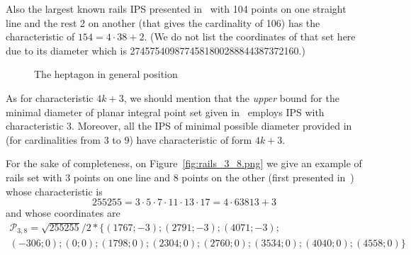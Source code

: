 \documentclass[a4paper,14pt]{article} %
\theoremstyle{plain}
\theoremstyle{definition}
\begin{document}
Also the largest known rails IPS presented in~\cite{momot2022example}
with 104 points on one straight line and the rest 2 on another
(that gives the cardinality of 106) has the characteristic of $154 = 4 \cdot 38 + 2$.
(We do not list the coordinates of that set here due to its diameter which is 2745754098774581800288844387372160.)

\begin{figure}
\caption{The heptagon in general position}
\label{fig:heptagon2}
\end{figure}

As for characteristic $4k+3$, we should mention that the \emph{upper} bound for the minimal diameter
of planar integral point set given in~\cite{harborth1993upper} employs IPS with characteristic $3$.
Moreover, all the IPS of minimal possible diameter provided in~\cite[\S 5, Figure 1]{harborth1993upper}
(for cardinalities from 3 to 9) have characteristic of form $4k+3$.

For the sake of completeness, on Figure~\ref{fig:rails_3_8.png}
we give an example of rails set
with 3 points on one line and 8 points on the other (first presented in~\cite[Figure 1]{avdeev2019particular})
whose characteristic is
\begin{equation}
	255255 = 3 \cdot 5 \cdot 7 \cdot 11 \cdot 13 \cdot 17
	 = 4 \cdot 63813  + 3
\end{equation}
and whose coordinates are
\begin{multline}
\mathcal{P}_{3,8}=\sqrt{255255}/2*\{
	( 1767 ; -3);
	( 2791 ; -3);
	( 4071 ; -3);
\\
	( -306 ; 0);
	( 0 ; 0);
	( 1798 ; 0);
	( 2304 ; 0);
	( 2760 ; 0);
	( 3534 ; 0);
	( 4040 ; 0);
	( 4558 ; 0)
\}
\end{multline}
\end{document}
